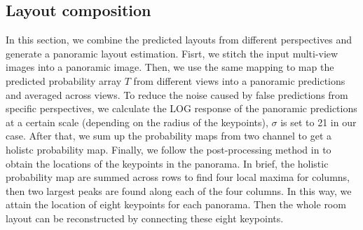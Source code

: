 

\subsection{Layout composition}
\label{sec:merging}
In this section, we combine the predicted layouts from different perspectives and generate a panoramic layout estimation. Fisrt, we stitch the input multi-view images into a panoramic image. Then, we use the same mapping to map the predicted probability array $T$ from different views into a panoramic predictions and averaged across views. To reduce the noise caused by false predictions from specific perspectives, we calculate the LOG response of the panoramic predictions at a certain scale (depending on the radius of the keypoints), $\sigma$ is set to 21 in our case. After that, we sum up the probability maps from two channel to get a holistc probability map. Finally, we follow the post-processing method in \cite{LayoutNet} to obtain the locations of the keypoints in the panorama. In brief, the holistic probability map are summed across rows to find four local maxima for columns, then two largest peaks are found along each of the four columns. In this way, we attain the location of eight keypoints for each panorama. Then the whole room layout can be reconstructed by connecting these eight keypoints. 


